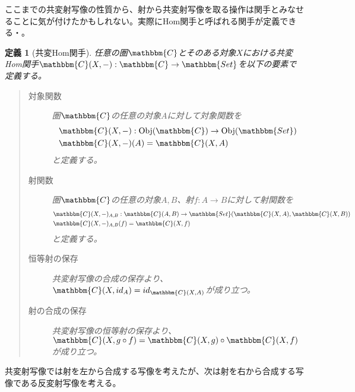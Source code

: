\documentclass[dvipdfmx]{jsarticle}
\newcommand{\cat}[1]{\mathbbm{#1}}
\newcommand{\arrow}{\rightarrow}
\newcommand{\functor}[3]{#1:\cat{#2}\arrow \cat{#3}}
\newcommand{\obj}[1]{\mathrm{Obj}(\cat{#1})}
\newcommand{\mor}[3]{#1:#2\arrow #3}
\newcommand{\arset}[3]{\cat{#1}(#2,#3)}
\newtheorem{define}{定義}[section]
\numberwithin{proof}{subsection}
\numberwithin{prop}{subsection}
\numberwithin{define}{subsection}
\begin{document}
	ここまでの共変射写像の性質から、射から共変射写像を取る操作は関手とみなせることに気が付けたかもしれない。実際にHom関手と呼ばれる関手が定義できる・。
	\begin{define}[共変Hom関手]
		任意の圏$\cat{C}$とそのある対象$X$における共変Hom関手$\functor{\arset{C}{X}{-}}{C}{Set}$を以下の要素で定義する。
		\begin{quote}
			\begin{description}
				\item[対象関数] 圏$\cat{C}$の任意の対象$A$に対して対象関数を
				\begin{align*}
					&\mor{\arset{C}{X}{-}}{\obj{C}}{\obj{Set}}\\
					&\arset{C}{X}{-}(A)=\arset{C}{X}{A}
				\end{align*}
				と定義する。
				\item[射関数] 圏$\cat{C}$の任意の対象$A,B$、射$\mor{f}{A}{B}$に対して射関数を
				\begin{align*}
					&\mor{\arset{C}{X}{-}_{A,B}}{\arset{C}{A}{B}}{\arset{Set}{\arset{C}{X}{A}}{\arset{C}{X}{B}}}\\
					&\arset{C}{X}{-}_{A,B}(f)=\arset{C}{X}{f}
				\end{align*}
				と定義する。
				\begin{center}
				\end{center}
				\item[恒等射の保存] 共変射写像の合成の保存より、$\arset{C}{X}{id_A}=id_{\arset{C}{X}{A}}$が成り立つ。
				\item[射の合成の保存] 共変射写像の恒等射の保存より、$\arset{C}{X}{g\circ f}=\arset{C}{X}{g}\circ\arset{C}{X}{f}$が成り立つ。
			\end{description}
		\end{quote}
	\end{define}
	共変射写像では射を左から合成する写像を考えたが、次は射を右から合成する写像である反変射写像を考える。
\end{document}
